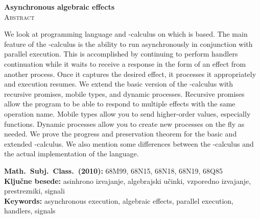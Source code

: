\documentclass[12pt,a4paper,twoside]{article}
\newcommand{\kljucnebesede}{asinhrono izvajanje\sep algebrajski učinki\sep vzporedno izvajanje\sep prestrezniki\sep signali} %
\newcommand{\keywords}{asynchronous execution\sep algebraic effects\sep parallel execution\sep handlers\sep signals} %
\newcommand{\literatura}{literatura}  %
\newcommand{\sep}{, }  %
\theoremstyle{definition} %
\theoremstyle{plain} %
\numberwithin{equation}{section}  %
\begin{document}
\vfill
\begin{center}
\textbf{Asynchronous algebraic effects} \\[3mm] %
\textsc{Abstract}\\[2mm]
\end{center}
We look at programming language \aeff{} and \lae{}-calculus on which \aeff{} is based. The main feature of the \lae-calculus is the ability to run asynchronously in conjunction with parallel execution.
This is accomplished by continuing to perform handlers continuation while it waits to receive a response in the form of an effect from another process. Once it captures the desired effect, it processes it appropriately and execution resumes.
We extend the basic version of the \lae{}-calculus with recursive promises, mobile types, and dynamic processes.
Recursive promises allow the program to be able to respond to multiple effects with the same operation name.
Mobile types allow you to send higher-order values, especially functions.
Dynamic processes allow you to create new processes on the fly as needed.
We prove the progress and preservation theorem for the basic and extended \lae{}-calculus.
We also mention some differences between the \lae{}-calculus and the actual implementation of the \aeff{} language. 

\vfill\noindent
\textbf{Math.~Subj.~Class.~(2010):} 68M99, 68N15, 68N18, 68N19, 68Q85 \\[1mm]
\textbf{Ključne besede:} \kljucnebesede \\[1mm]
\textbf{Keywords:} \keywords

\cleardoublepage

\setcounter{page}{1}    %










%




\cleardoublepage                           %

\cleardoublepage                           %
\printindex
\end{document}

